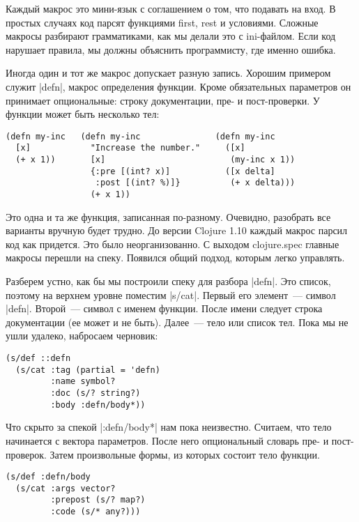Каждый макрос это мини-язык с соглашением о том, что подавать на вход. В простых
случаях код парсят функциями first, rest и условиями. Сложные макросы разбирают
грамматиками, как мы делали это с ini-файлом. Если код нарушает правила, мы
должны объяснить программисту, где именно ошибка.

Иногда один и тот же макрос допускает разную запись. Хорошим примером служит
\spverb|defn|, макрос определения функции. Кроме обязательных параметров он
принимает опциональные: строку документации, пре- и пост-проверки. У функции
может быть несколько тел:

\begin{verbatim}
(defn my-inc   (defn my-inc               (defn my-inc
  [x]            "Increase the number."     ([x]
  (+ x 1))       [x]                         (my-inc x 1))
                 {:pre [(int? x)]           ([x delta]
                  :post [(int? %)]}          (+ x delta)))
                 (+ x 1))
\end{verbatim}

Это одна и та же функция, записанная по-разному. Очевидно, разобрать все
варианты вручную будет трудно. До версии Clojure 1.10 каждый макрос парсил код
как придется. Это было неорганизованно. С выходом clojure.spec главные макросы
перешли на спеку. Появился общий подход, которым легко управлять.

Разберем устно, как бы мы построили спеку для разбора \spverb|defn|. Это список,
поэтому на верхнем уровне поместим \spverb|s/cat|. Первый его элемент~--- символ
\spverb|defn|. Второй~--- символ с именем функции. После имени следует строка
документации (ее может и не быть). Далее~--- тело или список тел. Пока мы не
ушли удалеко, набросаем черновик:

\begin{verbatim}
(s/def ::defn
  (s/cat :tag (partial = 'defn)
         :name symbol?
         :doc (s/? string?)
         :body :defn/body*))
\end{verbatim}

Что скрыто за спекой \spverb|:defn/body*| нам пока неизвестно. Считаем, что тело
начинается с вектора параметров. После него опциональный словарь пре- и пост-
проверок. Затем произвольные формы, из которых состоит тело функции.

\begin{verbatim}
(s/def :defn/body
  (s/cat :args vector?
         :prepost (s/? map?)
         :code (s/* any?)))
\end{verbatim}

